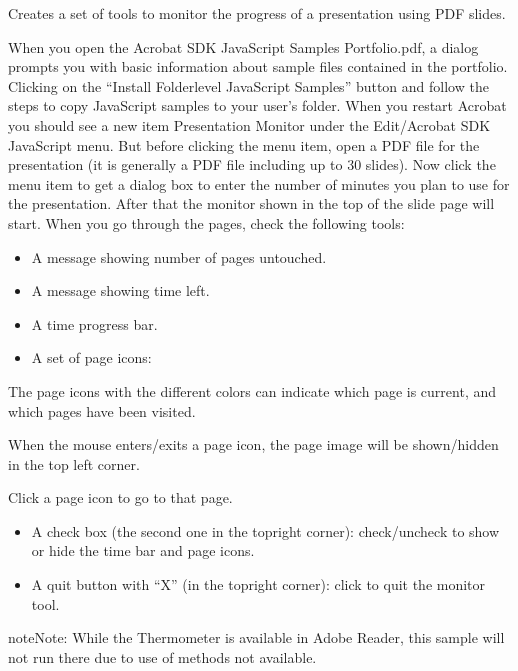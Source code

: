 \documentclass[letterpaper,12pt,english,openany,oneside]{sphinxmanual}
\begin{document}
Creates a set of tools to monitor the progress of a presentation using PDF slides.

When you open the Acrobat SDK JavaScript Samples Portfolio.pdf, a dialog prompts you with basic information about sample files contained in the portfolio. Clicking on the “Install Folder\sphinxhyphen{}level JavaScript Samples” button and follow the steps to copy JavaScript samples to your user’s  folder. When you restart Acrobat you should see a new item Presentation Monitor under the Edit/Acrobat SDK JavaScript menu. But before clicking the menu item, open a PDF file for the presentation (it is generally a PDF file including up to 30 slides). Now click the menu item to get a dialog box to enter the number of minutes you plan to use for the presentation. After that the monitor shown in the top of the slide page will start. When you go through the pages, check the following tools:
\begin{itemize}
\item {} 
A message showing number of pages untouched.

\item {} 
A message showing time left.

\item {} 
A time progress bar.

\item {} 
A set of page icons:

\end{itemize}

The page icons with the different colors can indicate which page is current, and which pages have been visited.

When the mouse enters/exits a page icon, the page image will be shown/hidden in the top left corner.

Click a page icon to go to that page.
\begin{itemize}
\item {} 
A check box (the second one in the top\sphinxhyphen{}right corner): check/uncheck to show or hide the time bar and page icons.

\item {} 
A quit button with “X” (in the top\sphinxhyphen{}right corner): click to quit the monitor tool.

\end{itemize}

\begin{sphinxadmonition}{note}{Note:}
While the Thermometer is available in Adobe Reader, this sample will not run there due to use of methods not available.
\end{sphinxadmonition}
\end{document}
